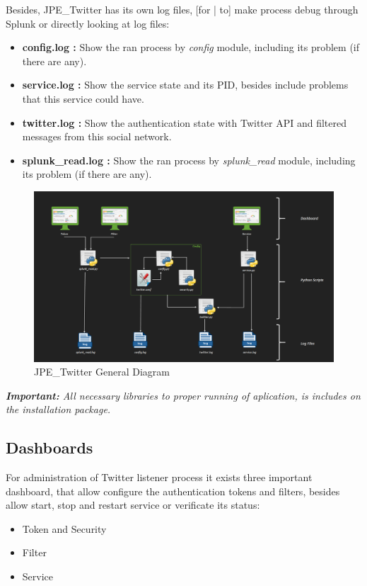 \documentclass[report]{article}
\begin{document}
Besides, JPE\_Twitter has its own log files, [for | to] make process debug through Splunk or directly looking at log files: 
\newline
\begin{itemize}
\item {\bf config.log :} Show the ran process by \textit{config} module, including its problem (if there are any).

\item {\bf service.log :} Show the service state and its PID, besides include problems that this service could have.

\item {\bf twitter.log :} Show the authentication state with Twitter API and filtered messages from this social network.

\item {\bf splunk\_read.log :} Show the ran process by \textit{splunk\_read} module, including its problem (if there are any).
\newline
\end{itemize}

\begin{figure}[h!]
	\centering
	\includegraphics[scale=0.33]{img/arquitectura.PNG}
	\caption{\color{text}JPE\_Twitter General Diagram}
\end{figure}

\textit{\small \textbf{Important:} All necessary libraries to proper running of aplication, is includes on the installation package.}
\newpage
\subsection{Dashboards}

For administration of Twitter listener process it exists three important dashboard, that allow configure the authentication tokens and filters, besides allow start, stop and restart service or verificate its status:
\newline
\begin{itemize}
\item Token and Security
\item Filter
\item Service
\newline
\end{itemize}
\end{document}
